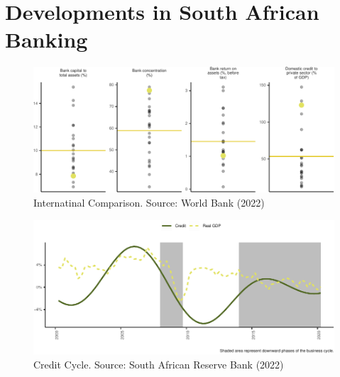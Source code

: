 \documentclass[
]{article}
\begin{document}
\citet{altunbas2004bank}

\citet{gambacorta2018bank}

\citet{berrospide2010effects}

\newpage

\hypertarget{developments-in-south-african-banking}{%
\section{Developments in South African Banking}\label{developments-in-south-african-banking}}

\begin{figure}[H]

\includegraphics{Bank_capital_and_bank_lending_files/figure-latex/unnamed-chunk-1-1} \hfill{}

\caption{Internatinal Comparison. Source: World Bank (2022)}\label{fig:unnamed-chunk-1}
\end{figure}

\begin{figure}[H]

\includegraphics{Bank_capital_and_bank_lending_files/figure-latex/unnamed-chunk-2-1} \hfill{}

\caption{Credit Cycle. Source: South African Reserve Bank (2022)}\label{fig:unnamed-chunk-2}
\end{figure}
\end{document}
